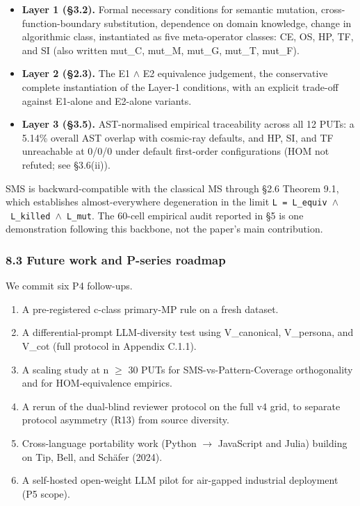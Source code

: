 \documentclass[review,12pt,authoryear]{elsarticle}
\providecommand{\tightlist}{\setlength{\itemsep}{0pt}\setlength{\parskip}{0pt}}
\begin{document}
\begin{itemize}
\tightlist
\item
  \textbf{Layer 1 (§3.2).} Formal necessary conditions for semantic
  mutation, cross-function-boundary substitution, dependence on domain
  knowledge, change in algorithmic class, instantiated as five
  meta-operator classes: CE, OS, HP, TF, and SI (also written mut\_C,
  mut\_M, mut\_G, mut\_T, mut\_F).
\item
  \textbf{Layer 2 (§2.3).} The E1 $\wedge$ E2 equivalence judgement, the
  conservative complete instantiation of the Layer-1 conditions, with an
  explicit trade-off against E1-alone and E2-alone variants.
\item
  \textbf{Layer 3 (§3.5).} AST-normalised empirical traceability across
  all 12 PUTs: a 5.14\% overall AST overlap with cosmic-ray defaults,
  and HP, SI, and TF unreachable at 0/0/0 under default first-order
  configurations (HOM not refuted; see §3.6(ii)).
\end{itemize}

SMS is backward-compatible with the classical MS through §2.6 Theorem
9.1, which establishes almost-everywhere degeneration in the limit
\texttt{L\ =\ L\_equiv\ $\wedge$\ L\_killed\ $\wedge$\ L\_mut}. The 60-cell empirical
audit reported in §5 is one demonstration following this backbone, not
the paper's main contribution.

\subsubsection{8.3 Future work and P-series
roadmap}\label{future-work-and-p-series-roadmap}

We commit six P4 follow-ups.

\begin{enumerate}
\def\labelenumi{(\alph{enumi})}
\item
  A pre-registered c-class primary-MP rule on a fresh dataset.
\item
  A differential-prompt LLM-diversity test using V\_canonical,
  V\_persona, and V\_cot (full protocol in Appendix C.1.1).
\item
  A scaling study at n $\geq$ 30 PUTs for SMS-vs-Pattern-Coverage
  orthogonality and for HOM-equivalence empirics.
\item
  A rerun of the dual-blind reviewer protocol on the full v4 grid, to
  separate protocol asymmetry (R13) from source diversity.
\item
  Cross-language portability work (Python $\to$ JavaScript and Julia)
  building on Tip, Bell, and Schäfer (2024).
\item
  A self-hosted open-weight LLM pilot for air-gapped industrial
  deployment (P5 scope).
\end{enumerate}
\end{document}
